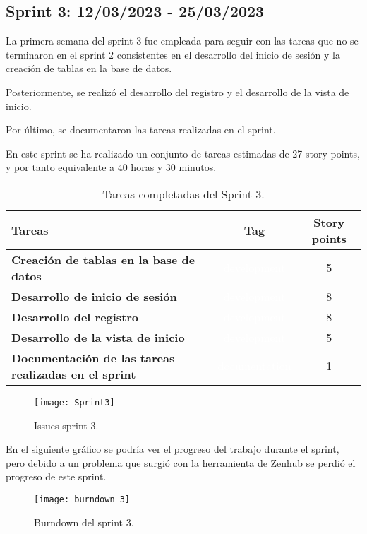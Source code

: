 \subsection{Sprint 3: 12/03/2023 - 25/03/2023}
La primera semana del sprint 3 fue empleada para seguir con las tareas que no se terminaron en el sprint 2 consistentes en el desarrollo del inicio de sesión y la creación de tablas en la base de datos.

Posteriormente, se realizó el desarrollo del registro y el desarrollo de la vista de inicio.

Por último, se documentaron las tareas realizadas en el sprint.

En este sprint se ha realizado un conjunto de tareas estimadas de 27 story points, y por tanto equivalente a 40 horas y 30 minutos.

\begin{table}[ht!]
    \centering
    \resizebox{15cm}{!} {
    \begin{tabular}{|l|c|c|}
    \hline
    \rowcolor[rgb]{0.99,0.93,0.93}
    \textbf{Tareas}     &\textbf{Tag}     & \textbf{Story points} \\ \hline
    \textbf{Creación de tablas en la base de datos}         &\cellcolor[rgb]{0.99,0.83,0.93}\textcolor{white}{development}      &5 \\ \hline 
    \textbf{Desarrollo de inicio de sesión}         &\cellcolor[rgb]{0.99,0.83,0.93}\textcolor{white}{development}      &8 \\ \hline 
    \textbf{Desarrollo del registro}         &\cellcolor[rgb]{0.99,0.83,0.93}\textcolor{white}{development}      &8 \\ \hline 
    \textbf{Desarrollo de la vista de inicio}         &\cellcolor[rgb]{0.99,0.83,0.93}\textcolor{white}{development}      &5 \\ \hline 
    \textbf{Documentación de las tareas realizadas en el sprint}         &\cellcolor[rgb]{0.0,0.33,0.71}\textcolor{white}{documentation}      &1 \\ \hline 
    \end{tabular}}
    \caption{Tareas completadas del Sprint 3.}
    \label{tab:my_label}
\end{table}

\begin{figure}[htb]
    \centering
    \texttt{[image: Sprint3]}
    \caption{Issues sprint 3.}
    \label{fig:Sprint3}
\end{figure}

En el siguiente gráfico se podría ver el progreso del trabajo durante el sprint, pero debido a un problema que surgió con la herramienta de Zenhub se perdió el progreso de este sprint.
\begin{figure}[htb]
    \centering
    \texttt{[image: burndown\_3]}
    \caption{Burndown del sprint 3.}
    \label{fig:burndown_3}
\end{figure}

